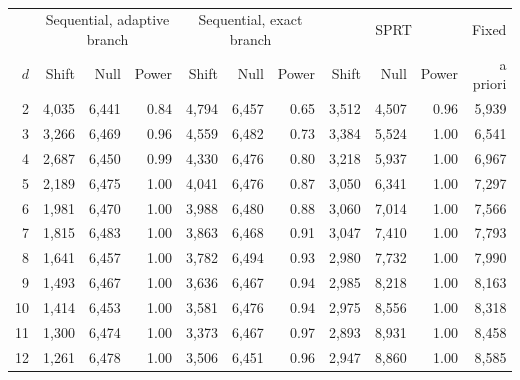 \begin{table}[ht]
\centering
\caption{}
\label{tab:en_width}
\small
\begin{tabular}{r rrr rrr rrr r}
\toprule
 & \multicolumn{3}{c}{Sequential, adaptive branch} & \multicolumn{3}{c}{Sequential, exact branch} & \multicolumn{3}{c}{SPRT} & Fixed \\
\cmidrule(lr){2-4} \cmidrule(lr){5-7} \cmidrule(lr){8-10}
$d$ & Shift & Null & Power & Shift & Null & Power & Shift & Null & Power & a priori \\
\midrule
2 & 4,035 & 6,441 & 0.84 & 4,794 & 6,457 & 0.65 & 3,512 & 4,507 & 0.96 & 5,939 \\
3 & 3,266 & 6,469 & 0.96 & 4,559 & 6,482 & 0.73 & 3,384 & 5,524 & 1.00 & 6,541 \\
4 & 2,687 & 6,450 & 0.99 & 4,330 & 6,476 & 0.80 & 3,218 & 5,937 & 1.00 & 6,967 \\
5 & 2,189 & 6,475 & 1.00 & 4,041 & 6,476 & 0.87 & 3,050 & 6,341 & 1.00 & 7,297 \\
6 & 1,981 & 6,470 & 1.00 & 3,988 & 6,480 & 0.88 & 3,060 & 7,014 & 1.00 & 7,566 \\
7 & 1,815 & 6,483 & 1.00 & 3,863 & 6,468 & 0.91 & 3,047 & 7,410 & 1.00 & 7,793 \\
8 & 1,641 & 6,457 & 1.00 & 3,782 & 6,494 & 0.93 & 2,980 & 7,732 & 1.00 & 7,990 \\
9 & 1,493 & 6,467 & 1.00 & 3,636 & 6,467 & 0.94 & 2,985 & 8,218 & 1.00 & 8,163 \\
10 & 1,414 & 6,453 & 1.00 & 3,581 & 6,476 & 0.94 & 2,975 & 8,556 & 1.00 & 8,318 \\
11 & 1,300 & 6,474 & 1.00 & 3,373 & 6,467 & 0.97 & 2,893 & 8,931 & 1.00 & 8,458 \\
12 & 1,261 & 6,478 & 1.00 & 3,506 & 6,451 & 0.96 & 2,947 & 8,860 & 1.00 & 8,585 \\
\bottomrule
\end{tabular}
\end{table}
